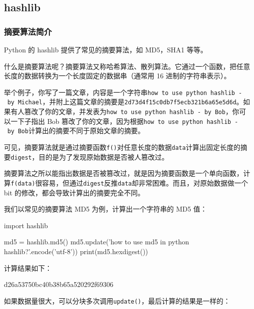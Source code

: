 \hypertarget{hashlib}{%
\subsection{hashlib}\label{hashlib}}

\hypertarget{ux6458ux8981ux7b97ux6cd5ux7b80ux4ecb}{%
\subsubsection{摘要算法简介}\label{ux6458ux8981ux7b97ux6cd5ux7b80ux4ecb}}

Python 的 hashlib 提供了常见的摘要算法，如 MD5，SHA1 等等。

什么是摘要算法呢？摘要算法又称哈希算法、散列算法。它通过一个函数，把任意长度的数据转换为一个长度固定的数据串（通常用
16 进制的字符串表示）。

举个例子，你写了一篇文章，内容是一个字符串\texttt{\textquotesingle{}how\ to\ use\ python\ hashlib\ -\ by\ Michael\textquotesingle{}}，并附上这篇文章的摘要是\texttt{\textquotesingle{}2d73d4f15c0db7f5ecb321b6a65e5d6d\textquotesingle{}}。如果有人篡改了你的文章，并发表为\texttt{\textquotesingle{}how\ to\ use\ python\ hashlib\ -\ by\ Bob\textquotesingle{}}，你可以一下子指出
Bob
篡改了你的文章，因为根据\texttt{\textquotesingle{}how\ to\ use\ python\ hashlib\ -\ by\ Bob\textquotesingle{}}计算出的摘要不同于原始文章的摘要。

可见，摘要算法就是通过摘要函数\texttt{f()}对任意长度的数据\texttt{data}计算出固定长度的摘要\texttt{digest}，目的是为了发现原始数据是否被人篡改过。

摘要算法之所以能指出数据是否被篡改过，就是因为摘要函数是一个单向函数，计算\texttt{f(data)}很容易，但通过\texttt{digest}反推\texttt{data}却非常困难。而且，对原始数据做一个
bit 的修改，都会导致计算出的摘要完全不同。

我们以常见的摘要算法 MD5 为例，计算出一个字符串的 MD5 值：

\begin{pythoncode}
import hashlib

md5 = hashlib.md5()
md5.update('how to use md5 in python hashlib?'.encode('utf-8'))
print(md5.hexdigest())
\end{pythoncode}

计算结果如下：

\begin{pythoncode}
d26a53750bc40b38b65a520292f69306
\end{pythoncode}

如果数据量很大，可以分块多次调用\texttt{update()}，最后计算的结果是一样的：

